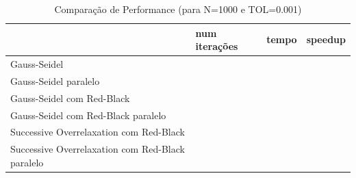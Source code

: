\documentclass[a4paper]{report}
\begin{document}
\begin{table}[h]
\centering
\begin{tabular}{|l|l|l|l|}
\hline
                                                 & num iterações & tempo & speedup \\ \hline
Gauss-Seidel                                     &               &       &         \\ \hline
Gauss-Seidel paralelo                            &               &       &         \\ \hline
Gauss-Seidel com Red-Black                       &               &       &         \\ \hline
Gauss-Seidel com Red-Black paralelo              &               &       &         \\ \hline
Successive Overrelaxation com Red-Black          &               &       &         \\ \hline
Successive Overrelaxation com Red-Black paralelo &               &       &         \\ \hline
\end{tabular}
\caption{Comparação de Performance (para N=1000 e TOL=0.001)}
\label{tab:tempo}
\end{table}
\end{document}
